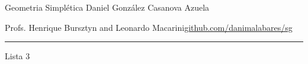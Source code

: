

\usepackage[style=authortitle-terse,backend=bibtex]{biblatex}




\begin{minipage}{\textwidth}
	\begin{minipage}{1\textwidth}
		Geometria Simpl\'etica \hfill Daniel González Casanova Azuela
		
		{\small Profs. Henrique Bursztyn and Leonardo Macarini\hfill\href{https://github.com/danimalabares/sg}{github.com/danimalabares/sg}}
	\end{minipage}
\end{minipage}\vspace{.2cm}\hrule

\vspace{10pt}
{\huge Lista 3}


